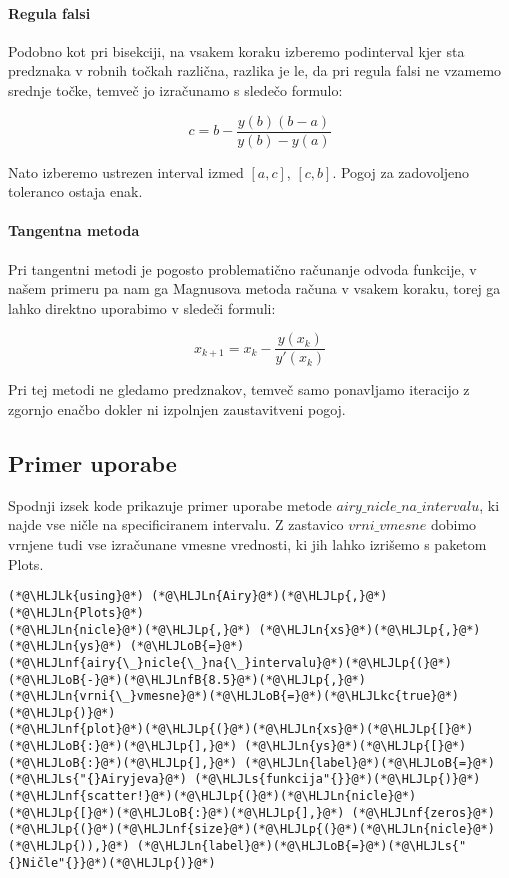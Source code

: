 \documentclass[12pt,a4paper]{article}
\newcommand{\HLJLk}[1]{\textcolor[RGB]{148,91,176}{\textbf{#1}}}
\newcommand{\HLJLkc}[1]{\textcolor[RGB]{59,151,46}{\textit{#1}}}
\newcommand{\HLJLn}[1]{#1}
\newcommand{\HLJLnf}[1]{\textcolor[RGB]{66,102,213}{#1}}
\newcommand{\HLJLs}[1]{\textcolor[RGB]{201,61,57}{#1}}
\newcommand{\HLJLnfB}[1]{\textcolor[RGB]{59,151,46}{#1}}
\newcommand{\HLJLoB}[1]{\textcolor[RGB]{102,102,102}{\textbf{#1}}}
\newcommand{\HLJLp}[1]{#1}
\begin{document}
\paragraph{Regula falsi}
Podobno kot pri bisekciji, na vsakem koraku izberemo podinterval kjer sta predznaka v robnih točkah različna, razlika je le, da pri regula falsi ne vzamemo srednje točke, temveč jo izračunamo s sledečo formulo:


\[
c = b - \frac{y(b)(b-a)}{y(b)-y(a)}
\]

Nato izberemo ustrezen interval izmed $[a,c]$, $[c,b]$. Pogoj za zadovoljeno toleranco ostaja enak.


\paragraph{Tangentna metoda}
Pri tangentni metodi je pogosto problematično računanje odvoda funkcije, v našem primeru pa nam ga Magnusova metoda računa v vsakem koraku, torej ga lahko direktno uporabimo v sledeči formuli:


\[
x_{k+1} = x_k - \frac{y(x_k)}{y'(x_k)}
\]

Pri tej metodi ne gledamo predznakov, temveč samo ponavljamo iteracijo z zgornjo enačbo dokler ni izpolnjen zaustavitveni pogoj.


\subsection{Primer uporabe}

Spodnji izsek kode prikazuje primer uporabe metode $\textit{airy\_nicle\_na\_intervalu}$, ki najde vse ničle na specificiranem intervalu. Z zastavico $\textit{vrni\_vmesne}$ dobimo vrnjene tudi vse izračunane vmesne vrednosti, ki jih lahko izrišemo s paketom Plots.


\begin{lstlisting}
(*@\HLJLk{using}@*) (*@\HLJLn{Airy}@*)(*@\HLJLp{,}@*) (*@\HLJLn{Plots}@*)
(*@\HLJLn{nicle}@*)(*@\HLJLp{,}@*) (*@\HLJLn{xs}@*)(*@\HLJLp{,}@*) (*@\HLJLn{ys}@*) (*@\HLJLoB{=}@*) (*@\HLJLnf{airy{\_}nicle{\_}na{\_}intervalu}@*)(*@\HLJLp{(}@*)(*@\HLJLoB{-}@*)(*@\HLJLnfB{8.5}@*)(*@\HLJLp{,}@*) (*@\HLJLn{vrni{\_}vmesne}@*)(*@\HLJLoB{=}@*)(*@\HLJLkc{true}@*)(*@\HLJLp{)}@*)
(*@\HLJLnf{plot}@*)(*@\HLJLp{(}@*)(*@\HLJLn{xs}@*)(*@\HLJLp{[}@*)(*@\HLJLoB{:}@*)(*@\HLJLp{],}@*) (*@\HLJLn{ys}@*)(*@\HLJLp{[}@*)(*@\HLJLoB{:}@*)(*@\HLJLp{],}@*) (*@\HLJLn{label}@*)(*@\HLJLoB{=}@*)(*@\HLJLs{"{}Airyjeva}@*) (*@\HLJLs{funkcija"{}}@*)(*@\HLJLp{)}@*)
(*@\HLJLnf{scatter!}@*)(*@\HLJLp{(}@*)(*@\HLJLn{nicle}@*)(*@\HLJLp{[}@*)(*@\HLJLoB{:}@*)(*@\HLJLp{],}@*) (*@\HLJLnf{zeros}@*)(*@\HLJLp{(}@*)(*@\HLJLnf{size}@*)(*@\HLJLp{(}@*)(*@\HLJLn{nicle}@*)(*@\HLJLp{)),}@*) (*@\HLJLn{label}@*)(*@\HLJLoB{=}@*)(*@\HLJLs{"{}Ničle"{}}@*)(*@\HLJLp{)}@*)
\end{lstlisting}
\end{document}
